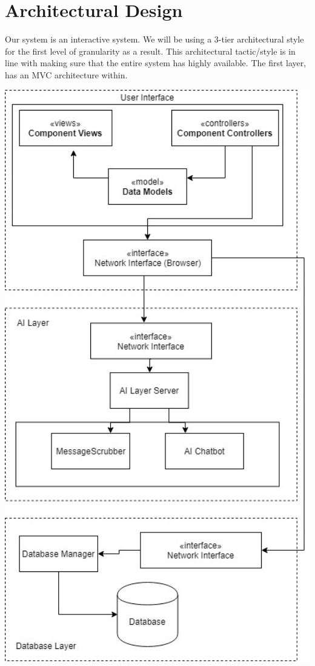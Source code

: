 \documentclass[11pt]{article}
\begin{document}
\section{Architectural Design}
Our system is an interactive system. We will be using a 3-tier architectural style for the first level of granularity as a result. This architectural tactic/style is in line with making sure that the entire system has highly available. The first layer, has an MVC architecture within.

 \includegraphics[width=1.0\textwidth]{images/Botic_Simplified_Architectural_Design.jpg}
\end{document}
